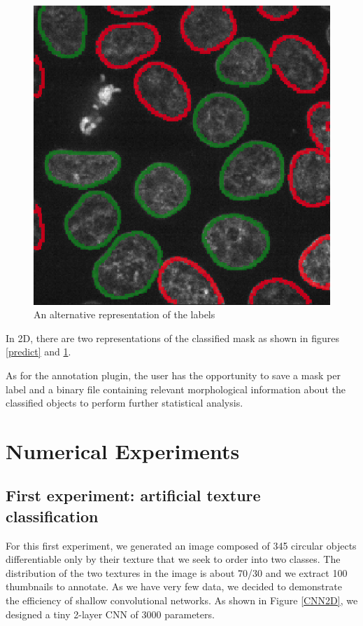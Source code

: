 \documentclass{article}
\begin{document}
\begin{figure}[h!]{}
 \centering
 \includegraphics[scale=0.15]{Figures/resultat_contour.png}
  \caption{An alternative representation of the labels}
  \label{predict_contours}

\end{figure}

In 2D, there are two representations of the classified mask as shown in figures \ref{predict} and \ref{predict_contours}.

As for the annotation plugin, the user has the opportunity to save a mask per label and a binary file containing relevant morphological information about the classified objects to perform further statistical analysis.


\section{Numerical Experiments}
\label{sec:experiments}


\subsection{First experiment: artificial texture classification}

For this first experiment, we generated an image composed of  345 circular objects differentiable only by their texture that we seek to order into two classes. The distribution of the two textures in the image is about 70/30 and we extract 100 thumbnails to annotate. 
As we have very few data, we decided to demonstrate the efficiency of shallow convolutional networks. As shown in Figure \ref{CNN2D}, we designed a tiny 2-layer CNN of 3000 parameters.
\end{document}
